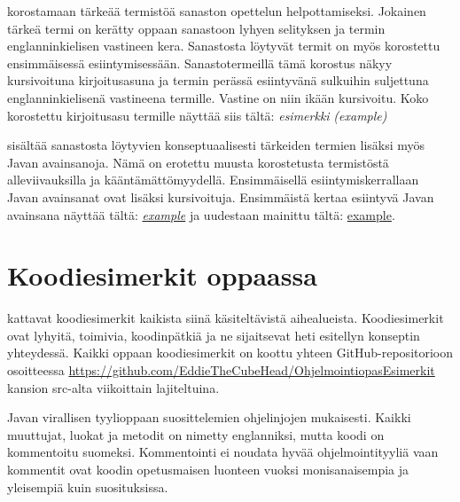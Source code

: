 \documentclass{tufte-book}
\newcommand{\eng}[1]{\textit{(#1)}}
\newcommand{\newnogls}[1]{\textit{#1}}
\newcommand{\newengnogls}[2]{\newnogls{#1} \eng{#2}}
\newcommand{\javanogls}[1]{\underline{#1}}
\newcommand{\newjavanogls}[1]{\textit{\javanogls{#1}}}
\begin{document}
 korostamaan tärkeää termistöä sanaston opettelun helpottamiseksi.
Jokainen tärkeä termi on kerätty oppaan sanastoon lyhyen selityksen ja termin englanninkielisen
vastineen kera. Sanastosta löytyvät termit on myös korostettu ensimmäisessä esiintymisessään.
Sanastotermeillä tämä korostus näkyy kursivoituna kirjoitusasuna ja termin perässä esiintyvänä
sulkuihin suljettuna englanninkielisenä vastineena termille. Vastine on niin ikään kursivoitu.
Koko korostettu kirjoitusasu termille näyttää siis tältä: \newengnogls{esimerkki}{example}

 sisältää sanastosta löytyvien konseptuaalisesti tärkeiden termien
lisäksi myös Javan avainsanoja. Nämä on erotettu muusta korostetusta termistöstä alleviivauksilla
ja kääntämättömyydellä. Ensimmäisellä esiintymiskerrallaan Javan avainsanat ovat lisäksi
kursivoituja. Ensimmäistä kertaa esiintyvä Javan avainsana näyttää tältä: \newjavanogls{example}
ja uudestaan mainittu tältä: \javanogls{example}.


\section{Koodiesimerkit oppaassa}
\label{koodiesimerkeistä}

 kattavat koodiesimerkit kaikista siinä käsiteltävistä aihealueista.
Koodiesimerkit ovat lyhyitä, toimivia, koodinpätkiä ja ne sijaitsevat heti esitellyn konseptin
yhteydessä. Kaikki oppaan koodiesimerkit on koottu yhteen GitHub-repositorioon osoitteessa
\url{https://github.com/EddieTheCubeHead/OhjelmointiopasEsimerkit} kansion src-alta viikoittain
lajiteltuina.

 Javan virallisen tyylioppaan suosittelemien
ohjelinjojen mukaisesti. Kaikki muuttujat, luokat ja metodit on nimetty englanniksi, mutta koodi
on kommentoitu suomeksi. Kommentointi ei noudata hyvää ohjelmointityyliä vaan kommentit ovat
koodin opetusmaisen luonteen vuoksi monisanaisempia ja yleisempiä kuin suosituksissa.

\end{document}
